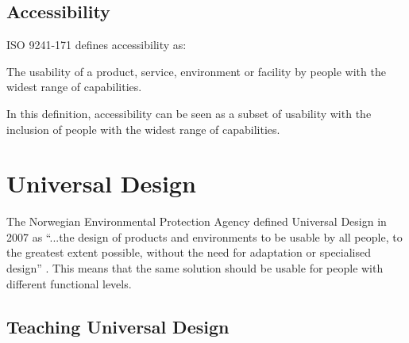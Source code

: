 \subsection{Accessibility}
ISO 9241-171 defines accessibility as:
\begin{displayquote}
    The usability of a product, service, environment or facility by people with the widest range of capabilities.
\end{displayquote}

In this definition, accessibility can be seen as a subset of usability with the inclusion of people with the widest range of capabilities.



\section{Universal Design}

The Norwegian Environmental Protection Agency defined Universal Design in 2007 as “...the design of products and environments to be usable by all people, to the greatest extent possible, without the need for adaptation or specialised design” \parencite{miljoverndepartementet_t-1468_2007}. This means that the same solution should be usable for people with different functional levels.

\subsection{Teaching Universal Design}





